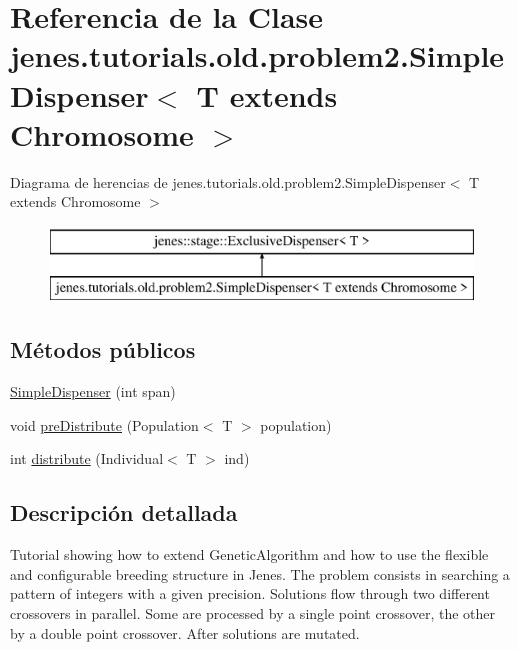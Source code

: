 \hypertarget{classjenes_1_1tutorials_1_1old_1_1problem2_1_1_simple_dispenser_3_01_t_01extends_01_chromosome_01_4}{\section{Referencia de la Clase jenes.\-tutorials.\-old.\-problem2.\-Simple\-Dispenser$<$ T extends Chromosome $>$}
\label{classjenes_1_1tutorials_1_1old_1_1problem2_1_1_simple_dispenser_3_01_t_01extends_01_chromosome_01_4}
}
Diagrama de herencias de jenes.\-tutorials.\-old.\-problem2.\-Simple\-Dispenser$<$ T extends Chromosome $>$\begin{figure}[H]
\begin{center}
\leavevmode
\includegraphics[height=2.000000cm]{classjenes_1_1tutorials_1_1old_1_1problem2_1_1_simple_dispenser_3_01_t_01extends_01_chromosome_01_4}
\end{center}
\end{figure}
\subsection*{Métodos públicos}
\begin{DoxyCompactItemize}
\item 
\hyperlink{classjenes_1_1tutorials_1_1old_1_1problem2_1_1_simple_dispenser_3_01_t_01extends_01_chromosome_01_4_ad9405ac409bd21e83c50f78472835da7}{Simple\-Dispenser} (int span)
\item 
void \hyperlink{classjenes_1_1tutorials_1_1old_1_1problem2_1_1_simple_dispenser_3_01_t_01extends_01_chromosome_01_4_a428636fd68143e1c24ea22bf626c290b}{pre\-Distribute} (Population$<$ T $>$ population)
\item 
int \hyperlink{classjenes_1_1tutorials_1_1old_1_1problem2_1_1_simple_dispenser_3_01_t_01extends_01_chromosome_01_4_a593230e918223c099f243524d3496783}{distribute} (Individual$<$ T $>$ ind)
\end{DoxyCompactItemize}


\subsection{Descripción detallada}
Tutorial showing how to extend {\ttfamily Genetic\-Algorithm} and how to use the flexible and configurable breeding structure in Jenes. The problem consists in searching a pattern of integers with a given precision. Solutions flow through two different crossovers in parallel. Some are processed by a single point crossover, the other by a double point crossover. After solutions are mutated.


